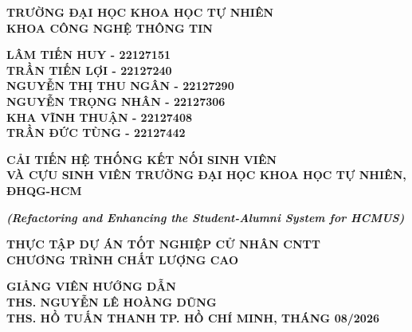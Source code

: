 \documentclass[12pt,a4paper,oneside]{report}
\begin{document}
\newpage
\thispagestyle{empty}
\begin{center}
{\fontsize{12}{16}\selectfont \textbf{TRƯỜNG ĐẠI HỌC KHOA HỌC TỰ NHIÊN}}\\[2pt]
{\fontsize{12}{16}\selectfont \textbf{KHOA CÔNG NGHỆ THÔNG TIN}}

\par\vspace{1.5cm}
{\fontsize{12}{18}\selectfont \textbf{LÂM TIẾN HUY - 22127151}}\\[3pt]
{\fontsize{12}{18}\selectfont \textbf{TRẦN TIẾN LỢI - 22127240}}\\[3pt]
{\fontsize{12}{18}\selectfont \textbf{NGUYỄN THỊ THU NGÂN - 22127290}}\\[3pt]
{\fontsize{12}{18}\selectfont \textbf{NGUYỄN TRỌNG NHÂN - 22127306}}\\[3pt]
{\fontsize{12}{18}\selectfont \textbf{KHA VĨNH THUẬN - 22127408}}\\[3pt]
{\fontsize{12}{18}\selectfont \textbf{TRẦN ĐỨC TÙNG - 22127442}}

\par\vspace{2cm}
{\fontsize{15}{21.5}\selectfont\bfseries CẢI TIẾN HỆ THỐNG KẾT NỐI SINH VIÊN\\[6pt]
VÀ CỰU SINH VIÊN TRƯỜNG ĐẠI HỌC KHOA HỌC TỰ NHIÊN, ĐHQG-HCM}

\par\vspace{0.4cm}
{\fontsize{12}{16}\selectfont\bfseries\itshape (Refactoring and Enhancing the Student-Alumni System for HCMUS)}

\par\vspace{1.5cm}
{\fontsize{12}{18}\selectfont\bfseries THỰC TẬP DỰ ÁN TỐT NGHIỆP CỬ NHÂN CNTT}\\[6pt]
{\fontsize{12}{18}\selectfont\bfseries CHƯƠNG TRÌNH CHẤT LƯỢNG CAO}

\par\vspace{1.5cm}
{\fontsize{12}{18}\selectfont
\textbf{GIẢNG VIÊN HƯỚNG DẪN}\\[4pt]
\textbf{THS. NGUYỄN LÊ HOÀNG DŨNG}\\[3pt]
\textbf{THS. HỒ TUẤN THANH}}
\vfill
{\fontsize{12}{18}\selectfont\bfseries TP. HỒ CHÍ MINH, THÁNG 08/2026}
\end{center}
\newpage
\end{document}
